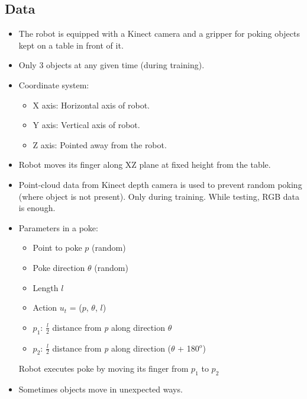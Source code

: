 \documentclass{article}
\begin{document}
    \subsection{Data}\label{subsec:Learning_to_Poke_by_Poking_Experiential_Learning_of_Intuitive_Physics_(NIPS_2016):data}
    \begin{itemize}
        \item The robot is equipped with a Kinect camera and a gripper for poking objects kept on a table in front of it.
        \item Only 3 objects at any given time (during training).
        \item Coordinate system:
        \begin{itemize}
            \item X axis: Horizontal axis of robot.
            \item Y axis: Vertical axis of robot.
            \item Z axis: Pointed away from the robot.
        \end{itemize}
        \item Robot moves its finger along XZ plane at fixed height from the table.
        \item Point-cloud data from Kinect depth camera is used to prevent random poking (where object is not present).
        Only during training.
        While testing, RGB data is enough.
        \item Parameters in a poke:
        \begin{itemize}
            \item Point to poke $p$ (random)
            \item Poke direction $\theta$ (random)
            \item Length $l$
            \item Action $u_t$ = ($p$, $\theta$, $l$)
            \item $p_1$: $\frac{l}{2}$ distance from \textit{p} along direction $\theta$
            \item $p_2$: $\frac{l}{2}$ distance from \textit{p} along direction ($\theta$ + 180$^o$)
        \end{itemize}
        Robot executes poke by moving its finger from $p_1$ to $p_2$
        \item Sometimes objects move in unexpected ways.
    \end{itemize}
\end{document}
